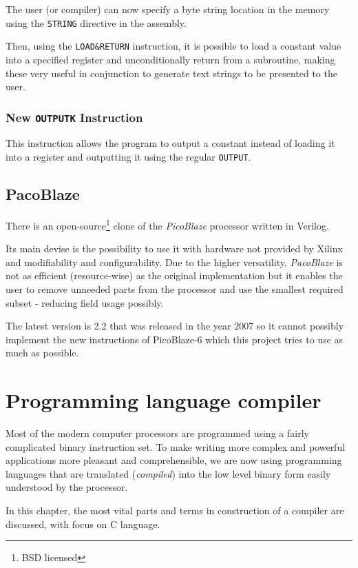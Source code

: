         The user (or compiler) can now specify a byte string location in the memory using the \texttt{STRING} directive in the assembly.

        Then, using the \texttt{LOAD\&RETURN} instruction, it is possible to load a constant value into a specified register and unconditionally return from a subroutine, making these very useful in conjunction to generate text strings to be presented to the user.

        \subsection{New \texttt{OUTPUTK} Instruction}

        This instruction allows the program to output a constant instead of loading it into a register and outputting it using the regular \texttt{OUTPUT}.

    \section{PacoBlaze}

    There is an open-source\footnote{BSD licensed} clone of the \emph{PicoBlaze} processor written in Verilog.

    Its main devise is the possibility to use it with hardware not provided by Xilinx and modifiability and configurability. Due to the higher versatility, \emph{PacoBlaze} is not as efficient (resource-wise) as the original implementation but it enables the user to remove unneeded parts from the processor and use the smallest required subset - reducing field usage possibly.

    The latest version is 2.2 that was released in the year 2007 so it cannot possibly implement the new instructions of PicoBlaze-6 which this project tries to use as much as possible.

\chapter{Programming language compiler}

Most of the modern computer processors are programmed using a fairly complicated binary instruction set. To make writing more complex and powerful applications more pleasant and comprehensible, we are now using programming languages that are translated (\emph{compiled}) into the low level binary form easily understood by the processor.

In this chapter, the most vital parts and terms in construction of a compiler are discussed, with focus on C language.

